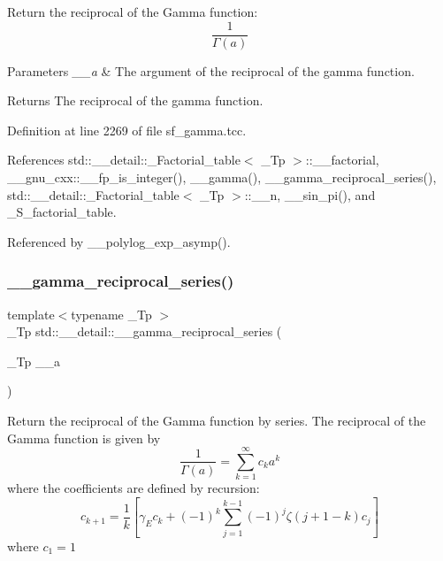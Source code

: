 Return the reciprocal of the Gamma function\+: \[ \frac{1}{\Gamma(a)} \]


\begin{DoxyParams}{Parameters}
{\em \+\_\+\+\_\+a} & The argument of the reciprocal of the gamma function. \\
\hline
\end{DoxyParams}
\begin{DoxyReturn}{Returns}
The reciprocal of the gamma function. 
\end{DoxyReturn}


Definition at line 2269 of file sf\+\_\+gamma.\+tcc.



References std\+::\+\_\+\+\_\+detail\+::\+\_\+\+Factorial\+\_\+table$<$ \+\_\+\+Tp $>$\+::\+\_\+\+\_\+factorial, \+\_\+\+\_\+gnu\+\_\+cxx\+::\+\_\+\+\_\+fp\+\_\+is\+\_\+integer(), \+\_\+\+\_\+gamma(), \+\_\+\+\_\+gamma\+\_\+reciprocal\+\_\+series(), std\+::\+\_\+\+\_\+detail\+::\+\_\+\+Factorial\+\_\+table$<$ \+\_\+\+Tp $>$\+::\+\_\+\+\_\+n, \+\_\+\+\_\+sin\+\_\+pi(), and \+\_\+\+S\+\_\+factorial\+\_\+table.



Referenced by \+\_\+\+\_\+polylog\+\_\+exp\+\_\+asymp().

\mbox{\label{namespacestd_1_1____detail_a08dc6d850e2f02ff45deaa4772298cf3}} 
\subsubsection{\texorpdfstring{\+\_\+\+\_\+gamma\+\_\+reciprocal\+\_\+series()}{\_\_gamma\_reciprocal\_series()}}
{\footnotesize\ttfamily template$<$typename \+\_\+\+Tp $>$ \\
\+\_\+\+Tp std\+::\+\_\+\+\_\+detail\+::\+\_\+\+\_\+gamma\+\_\+reciprocal\+\_\+series (\begin{DoxyParamCaption}\item[{\+\_\+\+Tp}]{\+\_\+\+\_\+a }\end{DoxyParamCaption})}

Return the reciprocal of the Gamma function by series. The reciprocal of the Gamma function is given by \[ \frac{1}{\Gamma(a)} = \sum_{k=1}^{\infty} c_k a^k \] where the coefficients are defined by recursion\+: \[ c_{k+1} = \frac{1}{k}\left[\gamma_E c_k + (-1)^k\sum_{j=1}^{k-1}(-1)^j\zeta(j+1-k)c_j\right] \] where $ c_1 = 1 $


